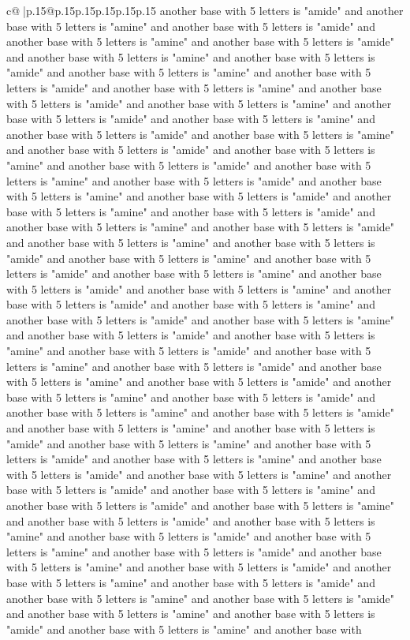\documentclass{article}
\begin{document}
{\begin{supertabular}{c@{$\;$}|p{.15\linewidth}@{}p{.15\linewidth}p{.15\linewidth}p{.15\linewidth}p{.15\linewidth}p{.15\linewidth}}
{{{another base with 5 letters is "amide" and another base with 5 letters is "amine" and another base with 5 letters is "amide" and another base with 5 letters is "amine" and another base with 5 letters is "amide" and another base with 5 letters is "amine" and another base with 5 letters is "amide" and another base with 5 letters is "amine" and another base with 5 letters is "amide" and another base with 5 letters is "amine" and another base with 5 letters is "amide" and another base with 5 letters is "amine" and another base with 5 letters is "amide" and another base with 5 letters is "amine" and another base with 5 letters is "amide" and another base with 5 letters is "amine" and another base with 5 letters is "amide" and another base with 5 letters is "amine" and another base with 5 letters is "amide" and another base with 5 letters is "amine" and another base with 5 letters is "amide" and another base with 5 letters is "amine" and another base with 5 letters is "amide" and another base with 5 letters is "amine" and another base with 5 letters is "amide" and another base with 5 letters is "amine" and another base with 5 letters is "amide" and another base with 5 letters is "amine" and another base with 5 letters is "amide" and another base with 5 letters is "amine" and another base with 5 letters is "amide" and another base with 5 letters is "amine" and another base with 5 letters is "amide" and another base with 5 letters is "amine" and another base with 5 letters is "amide" and another base with 5 letters is "amine" and another base with 5 letters is "amide" and another base with 5 letters is "amine" and another base with 5 letters is "amide" and another base with 5 letters is "amine" and another base with 5 letters is "amide" and another base with 5 letters is "amine" and another base with 5 letters is "amide" and another base with 5 letters is "amine" and another base with 5 letters is "amide" and another base with 5 letters is "amine" and another base with 5 letters is "amide" and another base with 5 letters is "amine" and another base with 5 letters is "amide" and another base with 5 letters is "amine" and another base with 5 letters is "amide" and another base with 5 letters is "amine" and another base with 5 letters is "amide" and another base with 5 letters is "amine" and another base with 5 letters is "amide" and another base with 5 letters is "amine" and another base with 5 letters is "amide" and another base with 5 letters is "amine" and another base with 5 letters is "amide" and another base with 5 letters is "amine" and another base with 5 letters is "amide" and another base with 5 letters is "amine" and another base with 5 letters is "amide" and another base with 5 letters is "amine" and another base with 5 letters is "amide" and another base with 5 letters is "amine" and another base with 5 letters is "amide" and another base with 5 letters is "amine" and another base with 5 letters is "amide" and another base with 5 letters is "amine" and another base with 5 letters is "amide" and another base with 5 letters is "amine" and another base with 5 letters is "amide" and another base with 5 letters is "amine" and another base with }}}
\end{supertabular}}
\end{document}
